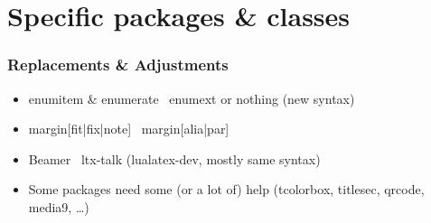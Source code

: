 \documentclass{ltx-talk}
\begin{document}

\section{Specific packages \& classes}

\begin{frame}
\frametitle{Replacements \& Adjustments}
\begin{itemize}
\item enumitem \& enumerate \textrightarrow\ enumext or nothing (new syntax)
\item margin[fit|fix|note] \textrightarrow\ margin[alia|par]
\item Beamer \textrightarrow\ ltx-talk (lualatex-dev, mostly same syntax)
\item Some packages need some (or a lot of) help (tcolorbox, titlesec, qrcode, media9, \ldots)
\end{itemize}
\end{frame}
\end{document}
